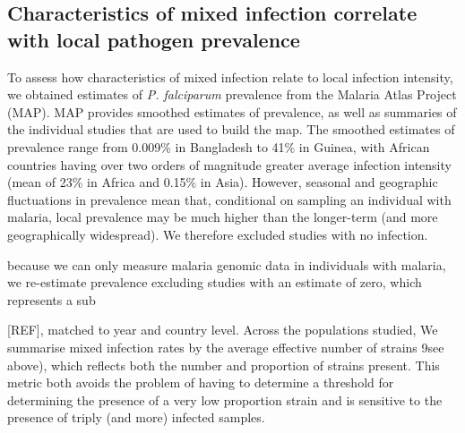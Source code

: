\documentclass[9pt,lineno]{elife}
\begin{document}
\begin{figure}[ht]
\begin{center}
   \end{center}
\end{figure}



\subsection{Characteristics of mixed infection correlate with local pathogen prevalence}

To assess how characteristics of mixed infection relate to local infection intensity, we obtained estimates of {\it P. falciparum} prevalence from the Malaria Atlas Project (MAP).  MAP provides smoothed estimates of prevalence, as well as summaries of the individual studies that are used to build the map. The smoothed estimates of prevalence  range from 0.009\% in Bangladesh to 41\% in Guinea, with African countries having over two orders of magnitude greater average infection intensity (mean of 23\% in Africa and 0.15\% in Asia). However, seasonal and geographic fluctuations in prevalence mean that, conditional on sampling an individual with malaria, local prevalence may be much higher than the longer-term (and more geographically widespread).  We therefore excluded studies with no infection.

because we can only measure malaria genomic data in individuals with malaria, we re-estimate prevalence excluding studies with an estimate of zero, which represents a sub


[REF], matched to year and country level.  Across the populations studied,  We summarise mixed infection rates by the average effective number of strains 9see above), which reflects both the number and proportion of strains present.  This metric both avoids the problem of having to determine a threshold for determining the presence of a very low proportion strain and is sensitive to the presence of triply (and more) infected samples.
\end{document}
